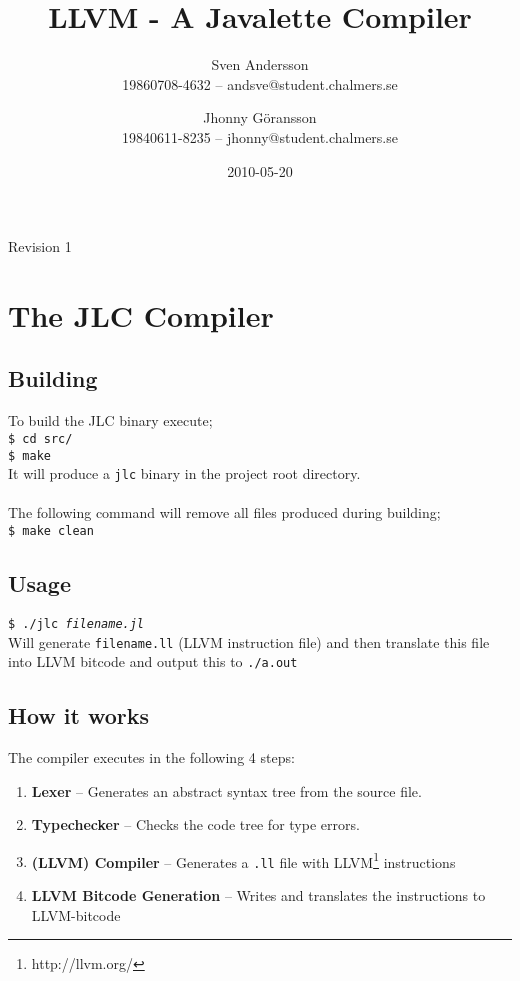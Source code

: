 \documentclass[]{article}
\title{LLVM - A Javalette Compiler}
\author{Sven Andersson\\19860708-4632 -- andsve@student.chalmers.se
        \and Jhonny Göransson\\19840611-8235 -- jhonny@student.chalmers.se}
\date{2010-05-20}
\begin{document}
\ifpdf
{}
\else
{}
\fi

\maketitle
\begin{center}
  Revision 1
\end{center}



\section{The JLC Compiler}
  \subsection*{Building}
    To build the JLC binary execute;\\
    \texttt{\$ cd src/}\\
    \texttt{\$ make}\\
    It will produce a \texttt{jlc} binary in the project root directory.\\
    \\
    The following command will remove all files produced during building;\\
    \texttt{\$ make clean}

  \subsection*{Usage}
    \texttt{\$ ./jlc \textit{filename.jl}}\\
    Will generate \texttt{filename.ll} (LLVM instruction file) and then translate this file into LLVM bitcode and output this to \texttt{./a.out}
  
  \subsection*{How it works}
    The compiler executes in the following 4 steps:
    \begin{enumerate}
      \item \textbf{Lexer} -- Generates an abstract syntax tree from the source file.
      \item \textbf{Typechecker} -- Checks the code tree for type errors.
      \item \textbf{(LLVM) Compiler} -- Generates a \texttt{.ll} file with LLVM\footnote{http://llvm.org/} instructions
      \item \textbf{LLVM Bitcode Generation} -- Writes and translates the instructions to LLVM-bitcode
    \end{enumerate}
\end{document}
